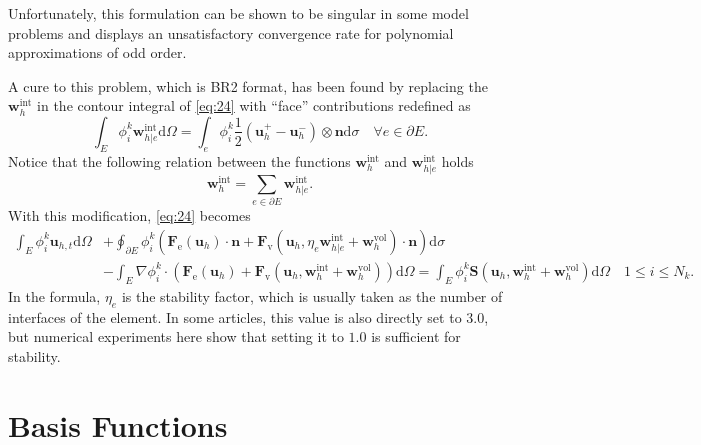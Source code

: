 \documentclass{develop-note}
\begin{document}
Unfortunately, this formulation can be shown to be singular in some model problems and displays an unsatisfactory convergence rate for polynomial approximations of odd order.

A cure to this problem, which is BR2 format, has been found by replacing the $\mathbf{w}_{h}^{\mathrm{int}}$ in the contour integral of \autoref{eq:24} with ``face'' contributions redefined as
\begin{equation}
  \int_{E}\phi_{i}^{k}\mathbf{w}_{h|e}^{\mathrm{int}}\mathrm{d}\Omega=\int_{e}\phi_{i}^{k}\dfrac{1}{2}(\mathbf{u}_{h}^{+}-\mathbf{u}_{h}^{-})\otimes\mathbf{n}\mathrm{d}\sigma\quad\forall e \in\partial E.
\end{equation}
Notice that the following relation between the functions $\mathbf{w}_{h}^{\mathrm{int}}$ and $\mathbf{w}_{h|e}^{\mathrm{int}}$ holds
\begin{equation}
  \mathbf{w}_{h}^{\mathrm{int}}=\sum_{e\in\partial E}\mathbf{w}_{h|e}^{\mathrm{int}}.
\end{equation}
With this modification, \autoref{eq:24} becomes
\begin{equation}
  \label{eq:27}
  \begin{aligned}
    \int_{E}\phi_{i}^{k}\mathbf{u}_{h,t}\mathrm{d}\Omega &+\oint_{\partial E}\phi_{i}^{k}(\mathbf{F}_{\mathrm{e}}(\mathbf{u}_{h})\cdot\mathbf{n}+\mathbf{F}_{\mathrm{v}}(\mathbf{u}_{h},\eta_{e}\mathbf{w}_{h|e}^{\mathrm{int}}+\mathbf{w}_{h}^{\mathrm{vol}})\cdot\mathbf{n})\mathrm{d}\sigma\\
    &-\int_{E}\nabla\phi_{i}^{k}\cdot(\mathbf{F}_{\mathrm{e}}(\mathbf{u}_{h})+\mathbf{F}_{\mathrm{v}}(\mathbf{u}_{h},\mathbf{w}_{h}^{\mathrm{int}}+\mathbf{w}_{h}^{\mathrm{vol}}))\mathrm{d}\Omega=\int_{E}\phi_{i}^{k}\mathbf{S}(\mathbf{u}_{h},\mathbf{w}_{h}^{\mathrm{int}}+\mathbf{w}_{h}^{\mathrm{vol}})\mathrm{d}\Omega\quad 1\leqslant i\leqslant N_{k}.
  \end{aligned}
\end{equation}
In the formula, $\eta_{e}$ is the stability factor, which is usually taken as the number of interfaces of the element\cite{bassiImplicitHighorderDiscontinuous2007}. In some articles, this value is also directly set to $3.0$, but numerical experiments here show that setting it to $1.0$ is sufficient for stability.

\section{Basis Functions}
\end{document}
